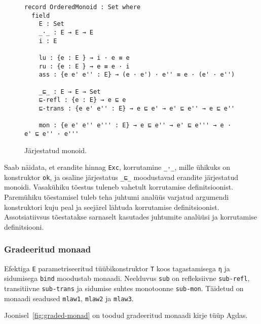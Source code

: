 \documentclass[a4paper,12pt]{article}
\begin{document}
\begin{figure}
  \begin{BVerbatim}
record OrderedMonoid : Set where
  field
    E : Set
    _·_ : E → E → E    
    i : E

    lu : {e : E } → i · e ≡ e
    ru : {e : E } → e ≡ e · i 
    ass : {e e' e'' : E} → (e · e') · e'' ≡ e · (e' · e'')
    
    _⊑_ : E → E → Set    
    ⊑-refl : {e : E} → e ⊑ e
    ⊑-trans : {e e' e'' : E} → e ⊑ e' → e' ⊑ e'' → e ⊑ e''

    mon : {e e' e'' e''' : E} → e ⊑ e'' → e' ⊑ e''' → e · e' ⊑ e'' · e'''
  \end{BVerbatim}
  \caption{Järjestatud monoid.}
  \label{fig:ordered-monoid}
\end{figure}

Saab näidata, et erandite hinnag {\tt Exc},
korrutamine {\tt _·_}, mille ühikuks on konstruktor {\tt ok},
ja osaline järjestatus {\tt _⊑_} moodustavad erandite järjestatud monoidi.
Vasakühiku tõestus tuleneb vahetult korrutamise definitsioonist.
Paremühiku tõestamisel tuleb teha juhtumi analüüs varjatud argumendi konstruktori kuju peal
ja seejärel lähtuda korrutamise definitsioonist.
Assotsiatiivsus tõestatakse sarnaselt kasutades juhtumite analüüsi ja korrutamise definitsiooni.


\subsubsection{Gradeeritud monaad}

Efektiga {\tt E} parametriseeritud tüübikonstruktor {\tt T} koos tagastamisega {\tt η} ja sidumisega {\tt bind}  moodustab monaadi.
Neelduvus {\tt sub} on refleksiivne {\tt sub-refl}, transitiivne {\tt sub-trans} ja  sidumise suhtes monotoonne {\tt sub-mon}.
Täidetud on monaadi seadused {\tt mlaw1}, {\tt mlaw2} ja {\tt mlaw3}.

Joonisel~\ref{fig:graded-monad} on toodud gradeeritud monaadi kirje tüüp Agdas.
\end{document}

